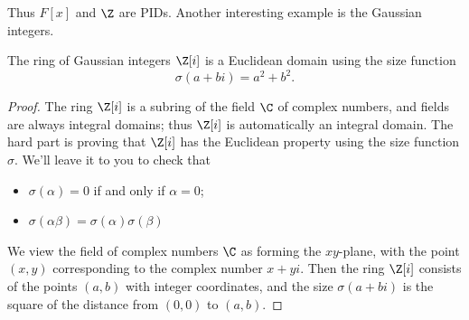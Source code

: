 \documentclass[math1530-lecture-notes]{subfiles}
\begin{document}
Thus $F[x]$ and $\Z$ are PIDs. Another interesting example is the Gaussian integers.
\begin{proposition}{}
  The ring of Gaussian integers $\Z[i]$ is a Euclidean domain using the size function \[
    \sigma(a+bi)=a^2+b^2
  .\]
\end{proposition}
\begin{proof}[Proof]
  The ring $\Z[i]$ is a subring of the field $\C$ of complex numbers, and fields are always integral
  domains; thus $\Z[i]$ is automatically an integral domain. The hard part is proving that $\Z[i]$
  has the Euclidean property using the size function $\sigma$. We'll leave it to you to check that
  \begin{itemize}
    \item $\sigma(\alpha)=0$ if and only if $\alpha=0$;
    \item $\sigma(\alpha\beta)=\sigma(\alpha)\sigma(\beta)$
  \end{itemize}
  We view the field of complex numbers $\C$ as forming the $xy$-plane, with the point $(x,y)$
  corresponding to the complex number $x+yi$. Then the ring $\Z[i]$ consists of the points $(a,b)$
  with integer coordinates, and the size $\sigma(a+bi)$ is the square of the distance from $(0,0)$
  to $(a,b)$.


\end{proof}
\end{document}
